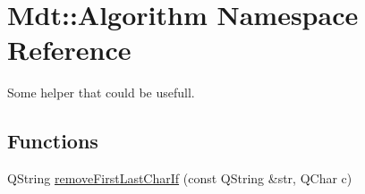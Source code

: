 \hypertarget{namespace_mdt_1_1_algorithm}{}\section{Mdt\+:\+:Algorithm Namespace Reference}
\label{namespace_mdt_1_1_algorithm}


Some helper that could be usefull.  


\subsection*{Functions}
\begin{DoxyCompactItemize}
\item 
Q\+String \hyperlink{namespace_mdt_1_1_algorithm_a042165280d1fd227ef45c07672b4a699}{remove\+First\+Last\+Char\+If} (const Q\+String \&str, Q\+Char c)\hypertarget{namespace_mdt_1_1_algorithm_a042165280d1fd227ef45c07672b4a699}{}\label{namespace_mdt_1_1_algorithm_a042165280d1fd227ef45c07672b4a699}


\end{DoxyCompactItemize}
